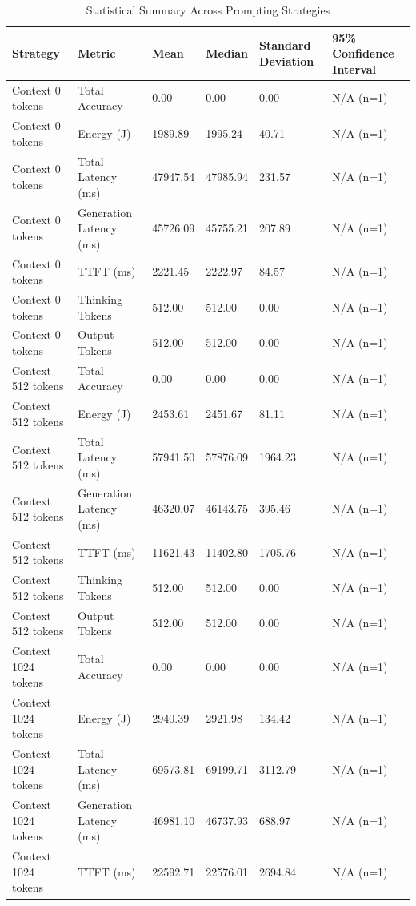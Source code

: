 \begin{table}
\caption{Statistical Summary Across Prompting Strategies}
\label{tab:statistical_summary}
\begin{tabular}{llllll}
\toprule
Strategy & Metric & Mean & Median & Standard Deviation & 95\% Confidence Interval \\
\midrule
Context 0 tokens & Total Accuracy & 0.00 & 0.00 & 0.00 & N/A (n=1) \\
Context 0 tokens & Energy (J) & 1989.89 & 1995.24 & 40.71 & N/A (n=1) \\
Context 0 tokens & Total Latency (ms) & 47947.54 & 47985.94 & 231.57 & N/A (n=1) \\
Context 0 tokens & Generation Latency (ms) & 45726.09 & 45755.21 & 207.89 & N/A (n=1) \\
Context 0 tokens & TTFT (ms) & 2221.45 & 2222.97 & 84.57 & N/A (n=1) \\
Context 0 tokens & Thinking Tokens & 512.00 & 512.00 & 0.00 & N/A (n=1) \\
Context 0 tokens & Output Tokens & 512.00 & 512.00 & 0.00 & N/A (n=1) \\
Context 512 tokens & Total Accuracy & 0.00 & 0.00 & 0.00 & N/A (n=1) \\
Context 512 tokens & Energy (J) & 2453.61 & 2451.67 & 81.11 & N/A (n=1) \\
Context 512 tokens & Total Latency (ms) & 57941.50 & 57876.09 & 1964.23 & N/A (n=1) \\
Context 512 tokens & Generation Latency (ms) & 46320.07 & 46143.75 & 395.46 & N/A (n=1) \\
Context 512 tokens & TTFT (ms) & 11621.43 & 11402.80 & 1705.76 & N/A (n=1) \\
Context 512 tokens & Thinking Tokens & 512.00 & 512.00 & 0.00 & N/A (n=1) \\
Context 512 tokens & Output Tokens & 512.00 & 512.00 & 0.00 & N/A (n=1) \\
Context 1024 tokens & Total Accuracy & 0.00 & 0.00 & 0.00 & N/A (n=1) \\
Context 1024 tokens & Energy (J) & 2940.39 & 2921.98 & 134.42 & N/A (n=1) \\
Context 1024 tokens & Total Latency (ms) & 69573.81 & 69199.71 & 3112.79 & N/A (n=1) \\
Context 1024 tokens & Generation Latency (ms) & 46981.10 & 46737.93 & 688.97 & N/A (n=1) \\
Context 1024 tokens & TTFT (ms) & 22592.71 & 22576.01 & 2694.84 & N/A (n=1) \\

\end{tabular}
\end{table}
